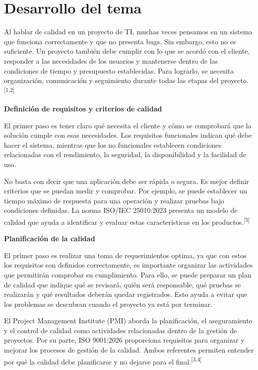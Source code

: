 \documentclass[12pt]{article}
\begin{document}
\section*{Desarrollo del tema}

Al hablar de calidad en un proyecto de TI, muchas veces pensamos en un sistema
que funciona correctamente y que no presenta bugs. Sin embargo, esto no es
suficiente. Un proyecto también debe cumplir con lo que se acordó con el
cliente, responder a las necesidades de los usuarios y mantenerse dentro de
las condiciones de tiempo y presupuesto establecidas. Para lograrlo, se
necesita organización, comunicación y seguimiento durante todas las etapas del
proyecto.\textsuperscript{[1,2]}

\noindent\textbf{Definición de requisitos y criterios de calidad}

El primer paso es tener claro qué necesita el cliente y cómo se comprobará que
la solución cumple con esas necesidades. Los requisitos funcionales indican
qué debe hacer el sistema, mientras que los no funcionales establecen
condiciones relacionadas con el rendimiento, la seguridad, la disponibilidad
y la facilidad de uso.

No basta con decir que una aplicación debe ser rápida o segura. Es mejor
definir criterios que se puedan medir y comprobar. Por ejemplo, se puede
establecer un tiempo máximo de respuesta para una operación y realizar pruebas
bajo condiciones definidas. La norma ISO/IEC 25010:2023 presenta un modelo de
calidad que ayuda a identificar y evaluar estas características en los
productos.\textsuperscript{[5]}

\noindent\textbf{Planificación de la calidad}

El primer paso es realizar una toma de requerimientos optima, ya que con estos los requisitos son definidos correctamente, es importante organizar las actividades
que permitirán comprobar su cumplimiento. Para ello, se puede preparar un
plan de calidad que indique qué se revisará, quién será responsable, qué
pruebas se realizarán y qué resultados deberán quedar registrados. Esto ayuda
a evitar que los problemas se descubran cuando el proyecto ya está por
terminar.

El Project Management Institute (PMI) aborda la planificación, el
aseguramiento y el control de calidad como actividades relacionadas dentro de
la gestión de proyectos. Por su parte, ISO 9001:2026 proporciona requisitos
para organizar y mejorar los procesos de gestión de la calidad. Ambos
referentes permiten entender por qué la calidad debe planificarse y no dejarse
para el final.\textsuperscript{[3,4]}
\end{document}
